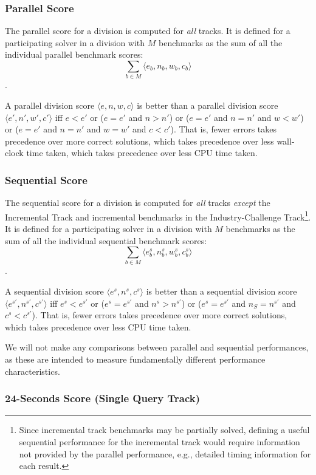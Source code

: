\documentclass[12pt]{article}
\newcommand{\maintrack}{Single Query Track\xspace}
\newcommand{\inctrack}{Incremental Track\xspace}
\newcommand{\challtrack}{Industry-Challenge Track\xspace}
\begin{document}
\subsubsection{Parallel Score}

The parallel score for a division is computed for \emph{all} tracks.  It is
defined for a participating solver in a division with $M$ benchmarks as the sum
of all the individual parallel benchmark scores:
$$\sum_{b\in M} \langle e_b , n_b , w_b, c_b\rangle$$.

\noindent
A parallel division score $\langle e, n, w, c\rangle$ is better than a parallel
division score $\langle e', n', w', c'\rangle$ iff $e < e'$ or ($e = e'$ and $n
> n'$) or ($e = e'$ and $n = n'$ and $w < w'$) or ($e = e'$ and $n = n'$ and $w
= w'$ and $c < c'$).  That is, fewer errors takes precedence over more correct
solutions, which takes precedence over less wall-clock time taken, which takes
precedence over less CPU time taken.

\subsubsection{Sequential Score}

The sequential score for a division is computed for \emph{all} tracks
\emph{except} the \inctrack and incremental benchmarks in the
\challtrack\footnote{Since incremental track benchmarks may be partially
solved, defining a useful sequential performance for the incremental track
would require information not provided by the parallel performance, e.g.,
detailed timing information for each result.}.  It is defined for a
participating solver in a division with $M$ benchmarks as the sum of all the
individual sequential benchmark scores:
$$\sum_{b\in M} \langle e_b^s, n_b^s, w_b^s, c_b^s\rangle$$.

\noindent
A sequential division score $\langle e^s, n^s, c^s\rangle$ is better than a
sequential division score $\langle e^{s'}, n^{s'}, c^{s'}\rangle$ iff
$e^s < e^{s'}$ or ($e^s = e^{s'}$ and $n^s > n^{s'}$) or ($e^s = e^{s'}$ and
$n_S = n^{s'}$ and $c^s < c^{s'}$).
That is, fewer errors takes precedence over more correct solutions,
which takes precedence over less CPU time taken.

We will not make any comparisons between parallel and sequential performances,
as these are intended to measure fundamentally different performance
characteristics.

\subsubsection{24-Seconds Score (\maintrack)}
\end{document}
